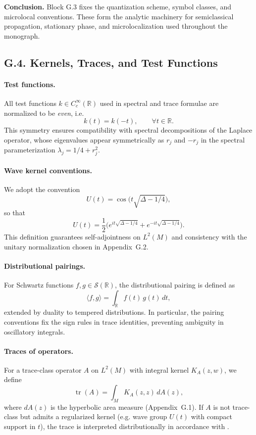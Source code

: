 \bigskip
\noindent\textbf{Conclusion.}  
Block G.3 fixes the quantization scheme, symbol classes, and microlocal conventions. These form the analytic machinery for semiclassical propagation, stationary phase, and microlocalization used throughout the monograph.

\subsection*{G.4. Kernels, Traces, and Test Functions}
\label{appG:kernels}

\paragraph{Test functions.}  
All test functions $k\in C_c^\infty(\mathbb{R})$ used in spectral and trace formulae are normalized to be \emph{even}, i.e.
\[
k(t) = k(-t), \qquad \forall t \in \mathbb{R}.
\]
This symmetry ensures compatibility with spectral decompositions of the Laplace operator, whose eigenvalues appear symmetrically as $r_j$ and $-r_j$ in the spectral parameterization $\lambda_j = 1/4 + r_j^2$.

\paragraph{Wave kernel conventions.}  
We adopt the convention
\[
U(t) = \cos\!\big(t\sqrt{\Delta - 1/4}\big),
\]
so that
\[
U(t) = \frac{1}{2}\big( e^{i t \sqrt{\Delta - 1/4}} + e^{-i t \sqrt{\Delta - 1/4}} \big).
\]
This definition guarantees self-adjointness on $L^2(M)$ and consistency with the unitary normalization chosen in Appendix~G.2.  

\paragraph{Distributional pairings.}  
For Schwartz functions $f,g \in \mathcal{S}(\mathbb{R})$, the distributional pairing is defined as
\[
\langle f, g \rangle = \int_{\mathbb{R}} f(t)\, g(t)\, dt,
\]
extended by duality to tempered distributions. In particular, the pairing conventions fix the sign rules in trace identities, preventing ambiguity in oscillatory integrals.

\paragraph{Traces of operators.}  
For a trace-class operator $A$ on $L^2(M)$ with integral kernel $K_A(z,w)$, we define
\[
\operatorname{tr}(A) = \int_M K_A(z,z)\, dA(z),
\]
where $dA(z)$ is the hyperbolic area measure (Appendix~G.1).  
If $A$ is not trace-class but admits a regularized kernel (e.g. wave group $U(t)$ with compact support in $t$), the trace is interpreted distributionally in accordance with \cite{Sogge}.

